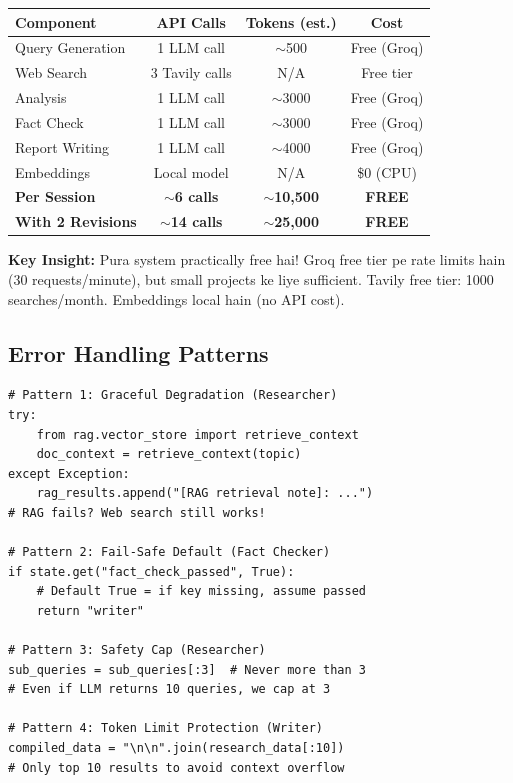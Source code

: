 \documentclass[12pt, a4paper]{article}
\begin{document}
\begin{conceptbox}[title={\faIcon{brain} ~Cost Analysis Per Research Session}]
\begin{center}
\small
\begin{tabular}{|l|c|c|c|}
\hline
\rowcolor{accentpurple!15}
\textbf{Component} & \textbf{API Calls} & \textbf{Tokens (est.)} & \textbf{Cost} \\
\hline
Query Generation & 1 LLM call & $\sim$500 & Free (Groq) \\
\hline
Web Search & 3 Tavily calls & N/A & Free tier \\
\hline
Analysis & 1 LLM call & $\sim$3000 & Free (Groq) \\
\hline
Fact Check & 1 LLM call & $\sim$3000 & Free (Groq) \\
\hline
Report Writing & 1 LLM call & $\sim$4000 & Free (Groq) \\
\hline
Embeddings & Local model & N/A & \$0 (CPU) \\
\hline\hline
\textbf{Per Session} & \textbf{$\sim$6 calls} & \textbf{$\sim$10,500} & \textbf{FREE} \\
\hline
\textbf{With 2 Revisions} & \textbf{$\sim$14 calls} & \textbf{$\sim$25,000} & \textbf{FREE} \\
\hline
\end{tabular}
\end{center}

\textbf{Key Insight:} Pura system practically free hai! Groq free tier pe rate limits hain (30 requests/minute), but small projects ke liye sufficient. Tavily free tier: 1000 searches/month. Embeddings local hain (no API cost).
\end{conceptbox}

\subsection{Error Handling Patterns}

\begin{lstlisting}[style=pythonstyle, title={\color{accentgreen}\faIcon{file} Error Handling Patterns Used}]
# Pattern 1: Graceful Degradation (Researcher)
try:
    from rag.vector_store import retrieve_context
    doc_context = retrieve_context(topic)
except Exception:
    rag_results.append("[RAG retrieval note]: ...")
# RAG fails? Web search still works!

# Pattern 2: Fail-Safe Default (Fact Checker)
if state.get("fact_check_passed", True):
    # Default True = if key missing, assume passed
    return "writer"

# Pattern 3: Safety Cap (Researcher)
sub_queries = sub_queries[:3]  # Never more than 3
# Even if LLM returns 10 queries, we cap at 3

# Pattern 4: Token Limit Protection (Writer)
compiled_data = "\n\n".join(research_data[:10])
# Only top 10 results to avoid context overflow
\end{lstlisting}
\end{document}
